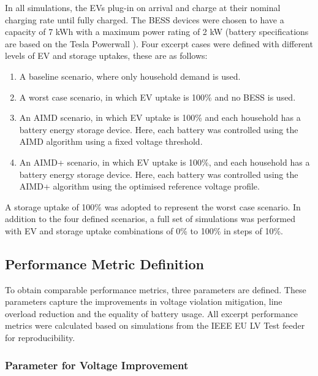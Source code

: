 In all simulations, the EVs plug-in on arrival and charge at their nominal charging rate until fully charged. The BESS devices were chosen to have a capacity of 7 kWh with a maximum power rating of 2 kW (battery specifications are based on the Tesla Powerwall \cite{Powerwall2015}).
Four excerpt cases were defined with different levels of EV and storage uptakes, these are as follows:
\begin{enumerate}[label=\textbf{\Alph*}, leftmargin=2.2em, labelsep=5.5mm]
\item A baseline scenario, where only household demand is used.
\item A worst case scenario, in which EV uptake is 100\% and no BESS is used.
\item An AIMD scenario, in which EV uptake is 100\% and each household has a battery energy storage device. Here, each battery was controlled using the AIMD algorithm using a fixed voltage threshold.
\item An AIMD+ scenario, in which EV uptake is 100\%, and each household has a battery energy storage device. Here, each battery was controlled using the AIMD+ algorithm using the optimised reference voltage profile.
\end{enumerate}

A storage uptake of 100\% was adopted to represent the worst case scenario. In addition to the four defined scenarios, a full set of simulations was performed with EV and storage uptake combinations of 0\% to 100\% in steps of 10\%.

\subsection{Performance Metric Definition}
\label{subsec-metrics}

To obtain comparable performance metrics, three parameters are defined. These parameters capture the improvements in voltage violation mitigation, line overload reduction and the equality of battery usage. All excerpt performance metrics were calculated based on simulations from the IEEE EU LV Test feeder for reproducibility.

\subsubsection{Parameter for Voltage Improvement}

